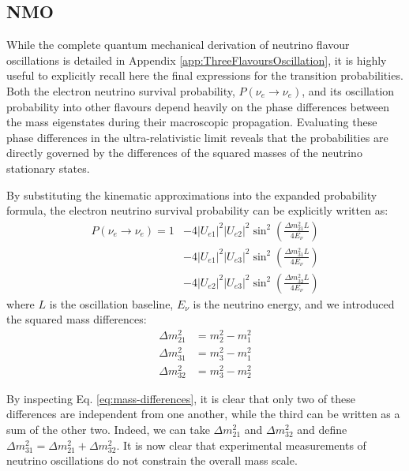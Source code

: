 \subsection{\ac{NMO}}
\label{subsec:NMO}
While the complete quantum mechanical derivation of neutrino flavour oscillations is detailed in Appendix \ref{app:ThreeFlavoursOscillation}, it is highly useful to explicitly recall here the final expressions for the transition probabilities. Both the electron neutrino survival probability, $P(\nu_e \to \nu_e)$, and its oscillation probability into other flavours depend heavily on the phase differences between the mass eigenstates during their macroscopic propagation. Evaluating these phase differences in the ultra-relativistic limit reveals that the probabilities are directly governed by the differences of the squared masses of the neutrino stationary states. 

By substituting the kinematic approximations into the expanded probability formula, the electron neutrino survival probability can be explicitly written as:
\begin{equation}
    \label{eq:P_ee_main}
    \begin{aligned}
        P(\nu_e \to \nu_e) = 1 &- 4 |U_{e1}|^2|U_{e2}|^2 \sin^2\left(\frac{\Delta m^2_{21} L}{4E_\nu}\right) \\
        &- 4 |U_{e1}|^2|U_{e3}|^2 \sin^2\left(\frac{\Delta m^2_{31} L}{4E_\nu}\right) \\
        &- 4 |U_{e2}|^2|U_{e3}|^2 \sin^2\left(\frac{\Delta m^2_{32} L}{4E_\nu}\right)
    \end{aligned}
\end{equation}
where $L$ is the oscillation baseline, $E_\nu$ is the neutrino energy, and we introduced the squared mass differences:
\begin{equation}
    \label{eq:mass-differences}
    \begin{aligned}
        \Delta m^2_{21} &= m^2_2 - m^2_1 \\
        \Delta m^2_{31} &= m^2_3 - m^2_1 \\
        \Delta m^2_{32} &= m^2_3 - m^2_2 
    \end{aligned}
\end{equation}

By inspecting Eq. \ref{eq:mass-differences}, it is clear that only two of these differences are independent from one another, while the third can be written as a sum of the other two. Indeed, we can take $\Delta m^2_{21}$ and $\Delta m^2_{32}$ and define $\Delta m^2_{31} = \Delta m^2_{21} + \Delta m^2_{32}$. It is now clear that experimental measurements of neutrino oscillations do not constrain the overall mass scale.

